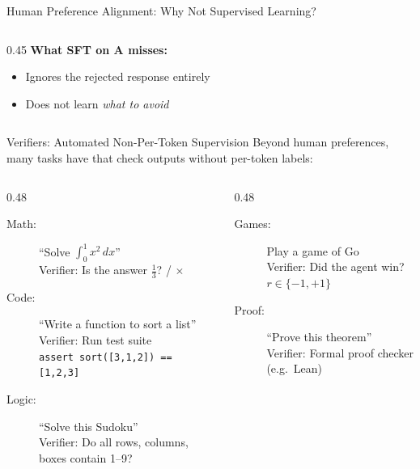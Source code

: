 \begin{frame}{Human Preference Alignment: Why Not Supervised Learning?}
\begin{columns}
\begin{column}{0.45\textwidth}
      \vspace{0.3em}
      \textbf{What SFT on A misses:}
      \begin{itemize}
        \item Ignores the rejected response entirely
        \item Does not learn \emph{what to avoid}
      \end{itemize}
    \end{column}
  \end{columns}
\end{frame}

\begin{frame}{Verifiers: Automated Non-Per-Token Supervision}
  Beyond human preferences, many tasks have  that check outputs without per-token labels:

  \begin{columns}[T]
    \begin{column}{0.48\textwidth}
      \begin{description}
        \item[Math:] ``Solve $\int_0^1 x^2\,dx$''\\
          Verifier: Is the answer $\frac{1}{3}$? \quad {\color{green!50!black}\checkmark} / {\color{red!70!black}$\times$}

        \item[Code:] ``Write a function to sort a list''\\
          Verifier: Run test suite\\
          \texttt{assert sort([3,1,2]) == [1,2,3]}

        \item[Logic:] ``Solve this Sudoku''\\
          Verifier: Do all rows, columns, boxes contain 1--9?
      \end{description}
    \end{column}
    \begin{column}{0.48\textwidth}
      \begin{description}
        \item[Games:] Play a game of Go\\
          Verifier: Did the agent win? $r \in \{-1, +1\}$

        \item[Proof:] ``Prove this theorem''\\
          Verifier: Formal proof checker (e.g.\ Lean)


\end{description}
\end{column}
\end{columns}
\end{frame}
